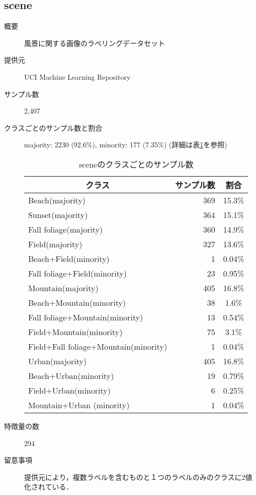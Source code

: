 \subsection{scene}
\begin{description}
    \item[概要] 風景に関する画像のラベリングデータセット
    \cite{scene}
    \item[提供元] UCI Machine Learning Repository
    \item[サンプル数] 2,407
    \item[クラスごとのサンプル数と割合] majority: 2230 (92.6\%), minority: 177 (7.35\%) (詳細は表\ref{tab:scene}を参照)

        \begin{table}[htbp]
            \centering
            \caption{sceneのクラスごとのサンプル数}
            \label{tab:scene}
            \begin{tabular}{lrc} \hline
                \multicolumn{1}{c}{クラス}&
                \multicolumn{1}{c}{サンプル数}&
                \multicolumn{1}{c}{割合}\\
                \hline
                \hline
                Beach(majority)& 369& 15.3\% \\
                Sunset(majority) &364& 15.1\% \\
                Fall foliage(majority)& 360& 14.9\% \\
                Field(majority) &327& 13.6\% \\
                Beach+Field(minority) &1& 0.04\% \\
                Fall foliage+Field(minority) &23& 0.95\% \\
                Mountain(majority) &405& 16.8\% \\
                Beach+Mountain(minority) &38& 1.6\% \\
                Fall foliage+Mountain(minority) &13& 0.54\% \\
                Field+Mountain(minority)& 75& 3.1\% \\
                Field+Fall foliage+Mountain(minority)& 1& 0.04\% \\
                Urban(majority) &405& 16.8\% \\
                Beach+Urban(minority)	 &19& 0.79\% \\
                Field+Urban(minority)	&6& 0.25\% \\
                Mountain+Urban (minority)&1& 0.04\% \\
                \hline
            \end{tabular}
        \end{table}

    \item[特徴量の数] 294
        
    \item[留意事項] 提供元により，複数ラベルを含むものと１つのラベルのみのクラスに2値化されている．
\end{description}

